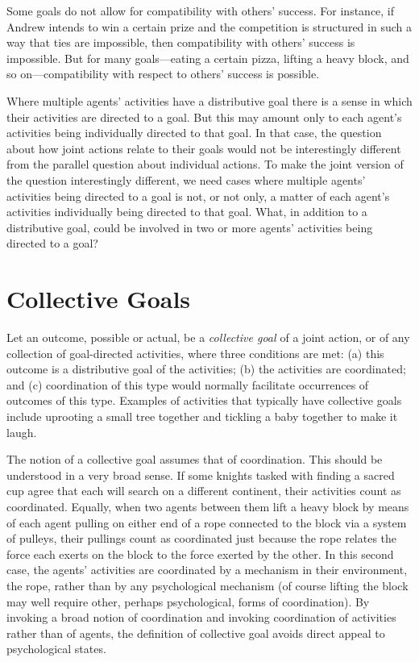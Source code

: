 \documentclass[12pt,a4paper]{extarticle}
\begin{document}
Some goals do not allow for compatibility with others'  success.  For instance, if Andrew intends to win a certain prize and the competition is structured in such a way that ties are impossible, then compatibility with others' success is impossible.  
But for many goals---eating a certain pizza, lifting a heavy block, and so on---compatibility with respect to others' success is possible.

Where multiple agents' activities have a distributive goal there is a sense in which their activities are directed to a goal.  But this may amount only to each agent's activities being individually directed to that goal.  In that case, the question about how joint actions relate to their goals would not be interestingly different from the parallel question about individual actions.
To make the joint version of the question interestingly different, we need cases where multiple agents' activities being directed to a goal is not, or not only, a matter of each agent's activities individually being directed to that goal.
What, in addition to a distributive goal, could be involved in two or more agents' activities being directed to a goal?



\section{Collective Goals}
\label{section_collective}

Let an outcome, possible or actual, be a \emph{collective goal \label{df_collective_goal}} of a joint action, or of any collection of goal-directed activities, where three conditions are met: 
	(a) this outcome is a distributive goal of the activities; 
	(b) the activities are coordinated; and 
	(c)  coordination of this type would normally  facilitate occurrences of outcomes of this type.  
Examples of activities that typically have collective goals include uprooting a small tree together and tickling a baby together to make it laugh.

The notion of a collective goal assumes that of coordination.  This should be understood in a very broad sense.  If some knights tasked with finding a sacred cup agree that each will search on a different continent, their activities count as coordinated.  Equally, when two agents between them lift a heavy block by means of each agent pulling on either end of a rope connected to the block via a system of pulleys, their pullings count as coordinated just because the rope relates the force each exerts on the block to the force exerted by the other.  In this second case, the agents' activities are coordinated by a mechanism in their environment, the rope, rather than by any psychological mechanism (of course lifting the block may well require other, perhaps psychological, forms of coordination).  
By invoking a broad notion of coordination 
and invoking coordination of activities rather than of agents,
the definition of collective goal avoids direct appeal to psychological states.
\end{document}
